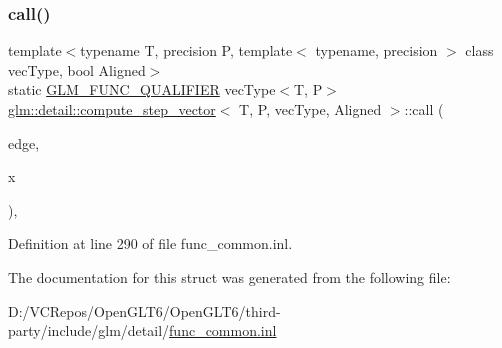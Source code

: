 \subsubsection{\texorpdfstring{call()}{call()}}
{\footnotesize\ttfamily template$<$typename T, precision P, template$<$ typename, precision $>$ class vec\+Type, bool Aligned$>$ \\
static \mbox{\hyperlink{setup_8hpp_a33fdea6f91c5f834105f7415e2a64407}{G\+L\+M\+\_\+\+F\+U\+N\+C\+\_\+\+Q\+U\+A\+L\+I\+F\+I\+ER}} vec\+Type$<$T, P$>$ \mbox{\hyperlink{structglm_1_1detail_1_1compute__step__vector}{glm\+::detail\+::compute\+\_\+step\+\_\+vector}}$<$ T, P, vec\+Type, Aligned $>$\+::call (\begin{DoxyParamCaption}\item[{vec\+Type$<$ T, P $>$ const \&}]{edge,  }\item[{vec\+Type$<$ T, P $>$ const \&}]{x }\end{DoxyParamCaption})\hspace{0.3cm}{\ttfamily [inline]}, {\ttfamily [static]}}



Definition at line 290 of file func\+\_\+common.\+inl.



The documentation for this struct was generated from the following file\+:\begin{DoxyCompactItemize}
\item 
D\+:/\+V\+C\+Repos/\+Open\+G\+L\+T6/\+Open\+G\+L\+T6/third-\/party/include/glm/detail/\mbox{\hyperlink{func__common_8inl}{func\+\_\+common.\+inl}}\end{DoxyCompactItemize}
